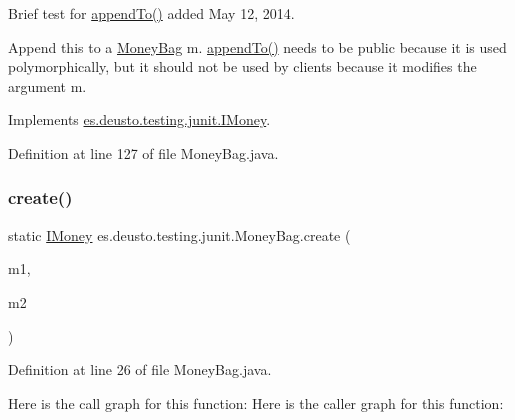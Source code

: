 Brief test for \mbox{\hyperlink{classes_1_1deusto_1_1testing_1_1junit_1_1_money_bag_ac8a5877b35b12939ce14543872ed18af}{append\+To()}} added May 12, 2014. 

Append this to a \mbox{\hyperlink{classes_1_1deusto_1_1testing_1_1junit_1_1_money_bag}{Money\+Bag}} m. \mbox{\hyperlink{classes_1_1deusto_1_1testing_1_1junit_1_1_money_bag_ac8a5877b35b12939ce14543872ed18af}{append\+To()}} needs to be public because it is used polymorphically, but it should not be used by clients because it modifies the argument m. 

Implements \mbox{\hyperlink{interfacees_1_1deusto_1_1testing_1_1junit_1_1_i_money_ae45bc758e69a0017f083f11d050c53cb}{es.\+deusto.\+testing.\+junit.\+I\+Money}}.



Definition at line 127 of file Money\+Bag.\+java.

\mbox{\label{classes_1_1deusto_1_1testing_1_1junit_1_1_money_bag_a8d2d54a342d2de2b75530600123efc9a}} 
\subsubsection{\texorpdfstring{create()}{create()}}
{\footnotesize\ttfamily static \mbox{\hyperlink{interfacees_1_1deusto_1_1testing_1_1junit_1_1_i_money}{I\+Money}} es.\+deusto.\+testing.\+junit.\+Money\+Bag.\+create (\begin{DoxyParamCaption}\item[{\mbox{\hyperlink{interfacees_1_1deusto_1_1testing_1_1junit_1_1_i_money}{I\+Money}}}]{m1,  }\item[{\mbox{\hyperlink{interfacees_1_1deusto_1_1testing_1_1junit_1_1_i_money}{I\+Money}}}]{m2 }\end{DoxyParamCaption})\hspace{0.3cm}{\ttfamily [static]}}



Definition at line 26 of file Money\+Bag.\+java.

Here is the call graph for this function\+:
Here is the caller graph for this function\+:
\mbox{\label{classes_1_1deusto_1_1testing_1_1junit_1_1_money_bag_a80926d10c9619bd2ad84eabe52ca03bb}} 
